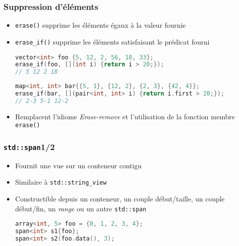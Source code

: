 \documentclass[C++.tex]{subfiles}
\begin{document}
\begin{frame}[fragile]
	\frametitle{Suppression d'éléments}
	\begin{itemize}
		\item \lstinline|erase()| supprime les éléments égaux à la valeur fournie
		\item \lstinline|erase_if()| supprime les éléments satisfaisant le prédicat fourni

		\begin{lstlisting}[language=C++]
vector<int> foo {5, 12, 2, 56, 18, 33};
erase_if(foo, [](int i) {return i > 20;});
// 5 12 2 18\end{lstlisting}

		\begin{lstlisting}[language=C++]
map<int, int> bar{{5, 1}, {12, 2}, {2, 3}, {42, 4}};
erase_if(bar, [](pair<int, int> i) {return i.first > 20;});
// 2-3 5-1 12-2 \end{lstlisting}

		\item Remplacent l'idiome \og \textit{Erase-remove}\fg{} et l'utilisation de la fonction membre \lstinline|erase()|
	\end{itemize}
\end{frame}

\begin{frame}[fragile]
	\frametitle{\lstinline|std::span|\titlehfill{}1/2}
	\begin{itemize}
		\item Fournit une vue sur un conteneur contigu


		\item Similaire à \lstinline|std::string_view|
		\item Constructible depuis un conteneur, un couple début/taille, un couple début/fin, un \textit{range} ou un autre \lstinline|std::span|

	\begin{lstlisting}[language=C++]
array<int, 5> foo = {0, 1, 2, 3, 4};
span<int> s1{foo};
span<int> s2(foo.data(), 3);\end{lstlisting}
	\end{itemize}
\end{frame}
\end{document}
